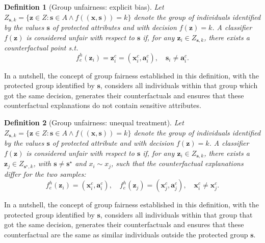 \documentclass[letterpaper]{article} %
\newtheorem{definition}{Definition}
\begin{document}
\begin{definition}[Group unfairness: explicit bias]\label{explicit_bias_group}
	Let $Z_{\boldsymbol{s}, k} = \{ \boldsymbol{z} \in Z : \boldsymbol{s} \in A \wedge f((\boldsymbol{x}, \boldsymbol{s})) = k \}$
	denote the group of individuals identified by the values $\boldsymbol{s}$ of protected attributes and with decision $f(\boldsymbol{z})=k$.
	A classifier $f(\boldsymbol{z})$ is considered unfair with respect to $\boldsymbol{s}$ if, for any $\boldsymbol{z}_i \in Z_{\boldsymbol{s}, k}$, there exists a counterfactual point s.t.
	$$ f_{e}^{h}(\boldsymbol{z}_{i}) = \boldsymbol{z}_{i}^{c} = (\boldsymbol{x}_{i}^{c}, \boldsymbol{a}_{i}^{c}),  \quad \boldsymbol{s}_{i} \neq \boldsymbol{a}_{i}^{c}.$$
\end{definition}
%
\noindent In a nutshell, the concept of group fairness established in this definition, with the protected group identified by $\boldsymbol{s}$, considers all individuals within that group which got the same decision, generates their counterfactuals and ensures that these counterfactual explanations do not contain sensitive attributes.

\begin{definition}[Group unfairness: unequal treatment]\label{unequal_treatment_group}
	Let $Z_{\boldsymbol{s}, k} = \{ \boldsymbol{z} \in Z : \boldsymbol{s} \in A \wedge f((\boldsymbol{x}, \boldsymbol{s})) = k \}$ denote the group of individuals identified by the values $\boldsymbol{s}$ of protected attribute and with decision $f(\boldsymbol{z})=k$.
	A classifier $f(\boldsymbol{z})$ is considered unfair with respect to $\boldsymbol{s}$  if, for any $\boldsymbol{z}_i \in Z_{\boldsymbol{s}, k}$, there exists a $\boldsymbol{z}_j \in Z_{\boldsymbol{s}^\star,k}$, with $\boldsymbol{s} \neq \boldsymbol{s}^\star$ and $x_i \sim x_j$, such that the counterfactual explanations differ for the two samples: 
	$$ f_{e}^{h}(\boldsymbol{z}_{i}) = (\boldsymbol{x}_{i}^c, \boldsymbol{a}_{i}^c), \quad f_{e}^{h}(\boldsymbol{z}_{j}) = (\boldsymbol{x}_{j}^{c}, \boldsymbol{a}_{j}^{c}), \quad \boldsymbol{x}_{i}^c \neq \boldsymbol{x}_{j}^{c}.$$ 
\end{definition}
%
\noindent In a nutshell, the concept of group fairness established in this definition, with the protected group identified by $\boldsymbol{s}$, considers all individuals within that group that got the same decision, generates their counterfactuals and ensures that these counterfactual are the same as similar individuals outside the protected group $\boldsymbol{s}$.
\end{document}
